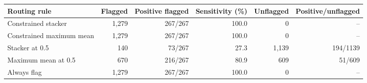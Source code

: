 \begin{tabular}{lrrrrr}\toprule
Routing rule & Flagged & Positive flagged & Sensitivity (\%) & Unflagged & Positive/unflagged\\\midrule
Constrained stacker & 1,279 & 267/267 & 100.0 & 0 & -- \\
Constrained maximum mean & 1,279 & 267/267 & 100.0 & 0 & -- \\
Stacker at 0.5 & 140 & 73/267 & 27.3 & 1,139 & 194/1139 \\
Maximum mean at 0.5 & 670 & 216/267 & 80.9 & 609 & 51/609 \\
Always flag & 1,279 & 267/267 & 100.0 & 0 & -- \\
\bottomrule\end{tabular}